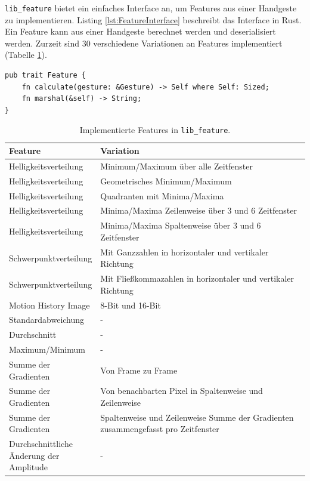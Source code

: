 \texttt{lib\_feature} bietet ein einfaches Interface an, um Features aus einer Handgeste zu implementieren. Listing \ref{lst:FeatureInterface} beschreibt das Interface in Rust. Ein Feature kann aus einer
Handgeste berechnet werden und deserialisiert werden. Zurzeit sind 30 verschiedene Variationen an Features implementiert (Tabelle \ref{tab:implemented_features}).
\begin{lstlisting}[label=lst:FeatureInterface,caption={Das Interface, um ein Feature zu implementieren.}]
pub trait Feature {
    fn calculate(gesture: &Gesture) -> Self where Self: Sized;
    fn marshal(&self) -> String;
}
\end{lstlisting}
\begin{table}[h!]
    \centering
    \begin{tabular}{ | p{0.3\linewidth} | p{0.7\linewidth} | }
        \hline
        Feature & Variation \\\hline
        Helligkeitsverteilung & Minimum/Maximum über alle Zeitfenster \\\hline
        Helligkeitsverteilung & Geometrisches Minimum/Maximum \\\hline
        Helligkeitsverteilung & Quadranten mit Minima/Maxima \\\hline
        Helligkeitsverteilung & Minima/Maxima Zeilenweise über 3 und 6 Zeitfenster \\\hline
        Helligkeitsverteilung & Minima/Maxima Spaltenweise über 3 und 6 Zeitfenster \\\hline
        Schwerpunktverteilung & Mit Ganzzahlen in horizontaler und vertikaler Richtung \\\hline
        Schwerpunktverteilung & Mit Fließkommazahlen in horizontaler und vertikaler Richtung \\\hline
        Motion History Image & 8-Bit und 16-Bit \\\hline
        Standardabweichung & - \\\hline
        Durchschnitt & - \\\hline
        Maximum/Minimum & - \\\hline
        Summe der Gradienten & Von Frame zu Frame \\\hline
        Summe der Gradienten & Von benachbarten Pixel in Spaltenweise und Zeilenweise \\\hline
        Summe der Gradienten & Spaltenweise und Zeilenweise Summe der Gradienten zusammengefasst pro Zeitfenster \\\hline
        Durchschnittliche Änderung der Amplitude & - \\
        \hline
    \end{tabular}
    \caption{Implementierte Features in \texttt{lib\_feature}.}
    \label{tab:implemented_features}
\end{table}
